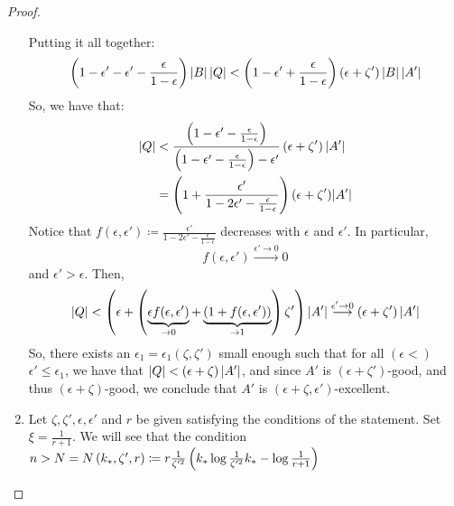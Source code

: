 \begin{proof}
\begin{enumerate}[label=(\alph*), ref=\alph*]
                Putting it all together:
                $$
                    \left( 1 - \epsilon' - \epsilon' - \frac{\epsilon}{1 - \epsilon} \right) \left| B \right| \left| Q \right| <
                    \left( 1 - \epsilon' + \frac{\epsilon}{1 - \epsilon} \right) \left( \epsilon + \zeta' \right) \left| B \right| \left| A' \right|
                $$
                So, we have that:
                \begin{align*}
                    \left| Q \right| & < \frac{\left( 1 - \epsilon' - \frac{\epsilon}{1 - \epsilon} \right)}
                                        {\left( 1 - \epsilon' - \frac{\epsilon}{1 - \epsilon} \right) - \epsilon'}
                                        \left( \epsilon + \zeta' \right) \left| A' \right| \\
                                    & = \left( 1 + \frac{\epsilon'}{1 - 2\epsilon' - \frac{\epsilon}{1 - \epsilon}} \right)
                                        (\epsilon + \zeta') |A'|
                \end{align*}
                Notice that $f(\epsilon, \epsilon') \coloneq \frac{\epsilon'}{1 - 2\epsilon' - \frac{\epsilon}{1 - \epsilon}}$
                decreases with $\epsilon$ and $\epsilon'$.
                In particular,
                $$
                    f(\epsilon, \epsilon') \overset{\epsilon' \to 0}{\longrightarrow} 0
                $$
                and $\epsilon' > \epsilon$.
                Then,
                $$
                    \left| Q \right| < \left( \epsilon + \left( \underbrace{\epsilon f(\epsilon, \epsilon')}_{\to 0} +
                    \underbrace{\left( 1 + f(\epsilon, \epsilon') \right)}_{\to 1} \right) \zeta' \right) |A'|
                    \overset{\epsilon' \to 0}{\longrightarrow} \left( \epsilon + \zeta' \right) |A'|
                $$
                So, there exists an $\epsilon_1 = \epsilon_1(\zeta, \zeta')$ small enough such that for all
                $(\epsilon <)$ $\epsilon' \leq \epsilon_1$, we have that $\left| Q \right| < \left( \epsilon + \zeta \right) |A'|$,
                and since $A'$ is $(\epsilon + \zeta')$-good, and thus $(\epsilon + \zeta)$-good, we conclude that
                $A'$ is $(\epsilon + \zeta, \epsilon')$-excellent. 
            \item Let $\zeta, \zeta', \epsilon, \epsilon'$ and $r$ be given satisfying the conditions of the statement.
                Set $\xi = \frac{1}{r + 1}$.
                We will see that the condition
                $n > N = N\left(k_{*}, \zeta', r \right) \coloneq r \frac{1}{\zeta'^2}\left( k_* \log{\frac{1}{\zeta'^2}k_*} - \log{\frac{1}{r + 1}} \right)$

\end{enumerate}
\end{proof}
